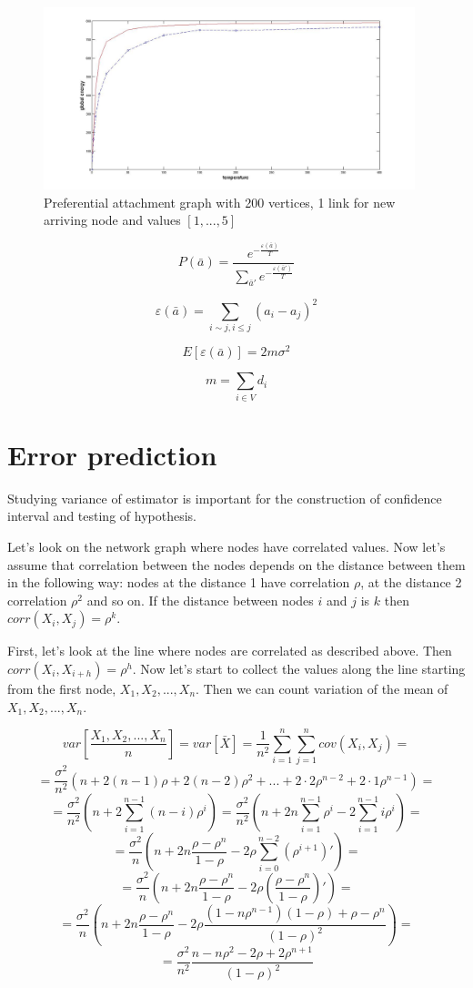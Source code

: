 \documentclass[12pt]{report}
\begin{document}
\begin{figure}[ht]
    \centering
    \includegraphics[height=200px]{pa200x1}
    \caption{ Preferential attachment graph with 200 vertices, 1 link for new arriving node and values $[1, ..., 5]$ }
\end{figure}


$$ P(\bar{a}) = \frac{ e^{-\frac{ \varepsilon (\bar{a})}{T}} }{ \sum\limits_{\bar{a}'} e^{-\frac{\varepsilon(\bar{a}')}{T}}} $$

$$ \varepsilon (\bar{a}) =  \sum\limits_{i \sim j, i \leq j} (a_i - a_j)^2  $$


$$ E[\varepsilon (\bar{a})] = 2m \sigma^2$$

$$ m = \sum_{i \in V} d_i$$


\section{Error prediction}

Studying variance of estimator is important for the construction of confidence interval and testing of hypothesis.


Let's look on the network graph where nodes have correlated values. Now let's assume that correlation between the nodes depends on the distance between them in the following way: nodes at the distance 1 have correlation $\rho$, at the distance 2 correlation $\rho^2$ and so on.
If the distance between nodes $i$ and $j$ is $k$ then $corr(X_i, X_j) = \rho^k$.

First, let's look at the line where nodes are correlated as described above. Then $corr(X_i, X_{i+h}) = \rho^h$. Now let's start to collect the values along the line starting from the first node, $X_1, X_2, ..., X_n$. Then we can count variation of the mean of $X_1, X_2, ..., X_n$.

$$var\left[ \frac{X_1, X_2, ..., X_n}{n} \right] = var\left[\bar{X} \right] = \frac{1}{n^2} \sum_{i=1}^{n}\sum_{j=1}^{n} cov(X_i, X_j) =$$ 
$$ = \frac{\sigma^2}{n^2} \left( n + 2(n-1)\rho + 2(n-2)\rho^2 + ... + 2\cdot2 \rho^{n-2}+ 2\cdot1 \rho^{n-1} \right) = $$
$$ = \frac{\sigma^2}{n^2} \left(n + 2\sum_{i=1}^{n-1} (n-i)\rho^i \right) = \frac{\sigma^2}{n^2} \left(n + 2n\sum_{i=1}^{n-1}\rho^i - 2\sum_{i=1}^{n-1}i\rho^i \right) = $$
$$ = \frac{\sigma^2}{n} \left(n + 2n\frac{\rho-\rho^{n}}{1-\rho} - 2\rho \sum_{i=0}^{n-2} (\rho^{i+1})' \right) = $$
$$ = \frac{\sigma^2}{n} \left(n + 2n\frac{\rho-\rho^{n}}{1-\rho} - 2\rho\left(\frac{\rho-\rho^n}{1-\rho}\right)' \right) = $$
$$ = \frac{\sigma^2}{n} \left(n + 2n\frac{\rho-\rho^{n}}{1-\rho} - 2\rho \frac{(1-n\rho^{n-1})(1-\rho) + \rho - \rho^n}{(1-\rho)^2} \right) = $$
$$ = \frac{\sigma^2}{n^2} \frac{n-n\rho^2 - 2\rho + 2\rho^{n+1}}{(1-\rho)^2}$$
\end{document}

